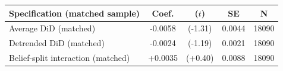 \begin{tabular}{lcccc}
\toprule
Specification (matched sample) & Coef. & ($t$) & SE & N \\
\midrule
Average DiD (matched) & -0.0058 & (-1.31) & 0.0044 & 18090 \\
Detrended DiD (matched) & -0.0024 & (-1.19) & 0.0021 & 18090 \\
Belief-split interaction (matched) & +0.0035 & (+0.40) & 0.0088 & 18090 \\
\bottomrule
\end{tabular}